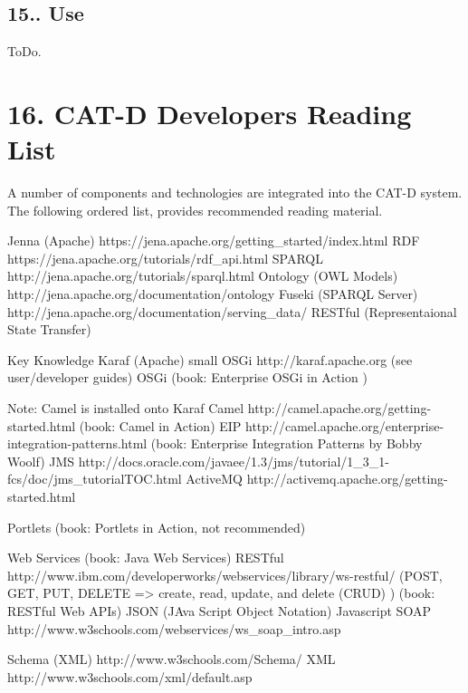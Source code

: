 \hypertarget{index_sec_15_1_2}{}\subsection{15..	\+Use}\label{index_sec_15_1_2}
\begin{DoxyVerb}ToDo.
\end{DoxyVerb}
\hypertarget{index_sec_16}{}\section{16.	\+C\+A\+T-\/\+D Developers Reading List}\label{index_sec_16}
\begin{DoxyVerb}A number of components and technologies are integrated into the CAT-D system.  The following ordered list, provides recommended reading material.


Jenna (Apache)      https://jena.apache.org/getting_started/index.html 
    RDF         https://jena.apache.org/tutorials/rdf_api.html
    SPARQL      http://jena.apache.org/tutorials/sparql.html 
    Ontology (OWL Models)   http://jena.apache.org/documentation/ontology 
    Fuseki (SPARQL Server)  http://jena.apache.org/documentation/serving_data/
        RESTful (Representaional State Transfer) 


Key Knowledge
Karaf (Apache) small OSGi http://karaf.apache.org (see user/developer guides)
    OSGi (book: Enterprise OSGi in Action )

Note: Camel is installed onto Karaf
Camel               http://camel.apache.org/getting-started.html 
        (book: Camel in Action) 
    EIP             http://camel.apache.org/enterprise-integration-patterns.html 
        (book: Enterprise Integration Patterns by Bobby Woolf) 
    JMS http://docs.oracle.com/javaee/1.3/jms/tutorial/1_3_1-fcs/doc/jms_tutorialTOC.html 
    ActiveMQ    http://activemq.apache.org/getting-started.html 


Portlets (book: Portlets in Action, not recommended)

Web Services (book: Java Web Services)
    RESTful http://www.ibm.com/developerworks/webservices/library/ws-restful/ 
        (POST, GET, PUT, DELETE => create, read, update, and delete (CRUD) )
        (book: RESTful Web APIs)
        JSON (JAva Script Object Notation)
            Javascript
    SOAP    http://www.w3schools.com/webservices/ws_soap_intro.asp 


Schema (XML)    http://www.w3schools.com/Schema/ 
    XML         http://www.w3schools.com/xml/default.asp 


\end{DoxyVerb}
